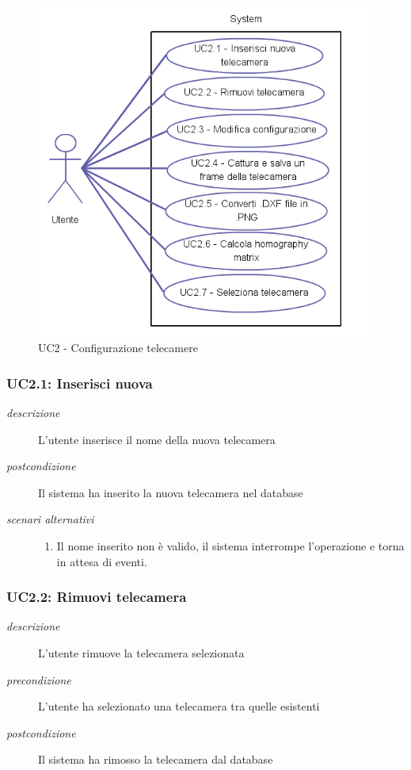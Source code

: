 \begin{figure}[htpb]
\centering
\includegraphics[scale=0.4]{./images/uc2.png}
\caption{UC2 - Configurazione telecamere}
\label{fig:uc2}
\end{figure} 

\subsubsection{UC2.1: Inserisci nuova} \label{sec:uc2.1}
\begin{description}
 \item[\em{descrizione}] L'utente inserisce il nome della nuova telecamera
 \item[\em{postcondizione}] Il sistema ha inserito la nuova telecamera nel database
\item[\em{scenari alternativi}]  \mbox{}
    \begin{enumerate} 
  \item Il nome inserito non è valido, il sistema interrompe l'operazione e torna in attesa di eventi.
  \end{enumerate} 
 \end{description}

\subsubsection{UC2.2: Rimuovi telecamera}\label{sec:uc2.2}
\begin{description}
 \item[\em{descrizione}] L'utente rimuove la telecamera selezionata
  \item[\em{precondizione}] L'utente ha selezionato una telecamera tra quelle esistenti
 \item[\em{postcondizione}] Il sistema ha rimosso la telecamera dal database
 \end{description}
 
